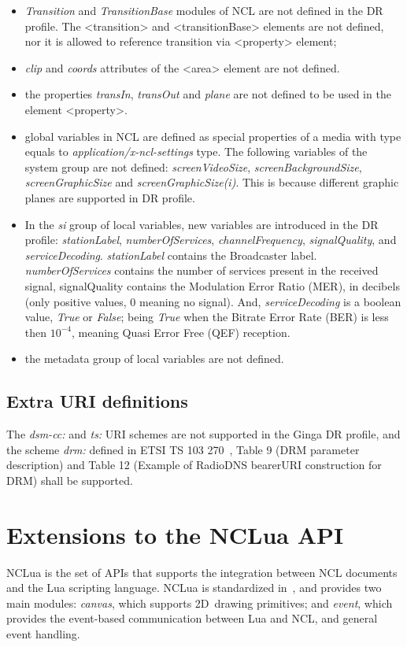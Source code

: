 \documentclass[11pt]{article}
\begin{document}
\begin{itemize}
\item \emph{Transition} and \emph{TransitionBase} modules of NCL are not
      defined in the DR profile. The <transition> and <transitionBase> elements
      are not defined, nor it is allowed to reference transition via <property>
      element;
\item \emph{clip} and \emph{coords} attributes of the <area> element are
      not defined.
\item the properties \emph{transIn}, \emph{transOut} and \emph{plane} are
      not defined to be used in the element <property>.
\item global variables in NCL are defined as special properties of a media with
      type equals to \emph{application/x-ncl-settings} type. The following
      variables of the system group are not defined: \emph{screenVideoSize},
      \emph{screenBackgroundSize}, \emph{screenGraphicSize} and
      \emph{screenGraphicSize(i)}. This is because different graphic planes
      are supported in DR profile.
\item In the \emph{si} group of local variables, new variables are introduced
      in the DR profile: \emph{stationLabel}, \emph{numberOfServices},
      \emph{channelFrequency}, \emph{signalQuality}, and
      \emph{serviceDecoding}. \emph{stationLabel} contains the Broadcaster
      label. \emph{numberOfServices} contains the number of services present
      in the received signal, signalQuality contains the Modulation
      Error Ratio (MER), in decibels (only positive values, 0 meaning no
      signal). And, \emph{serviceDecoding} is a boolean value, \emph{True}
      or \emph{False}; being \emph{True} when the Bitrate Error Rate (BER)
      is less then \(10^{-4}\), meaning Quasi Error Free (QEF) reception.
\item the metadata group of local variables are not defined.
\end{itemize}

\subsection{Extra URI definitions}
The \emph{dsm-cc:} and \emph{ts:} URI schemes are not supported in the Ginga
DR profile, and the scheme \emph{drm:} defined in
ETSI TS 103 270~\cite{ETSI-103270-2015}, Table 9 (DRM parameter description)
and Table 12 (Example of RadioDNS bearerURI construction for DRM) shall be
supported.

\section{Extensions to the NCLua API}
\label{sec:nclua_extensions}
NCLua is the set of APIs that supports the integration between NCL
documents and the Lua scripting language.
NCLua is standardized in~\cite{ITU-T-H761-2014,ABNT-15606-2-2015}, and provides
two main modules: \emph{canvas}, which supports 2D~drawing primitives; and
\emph{event}, which provides the event-based communication between Lua and
NCL, and general event handling.
\end{document}
